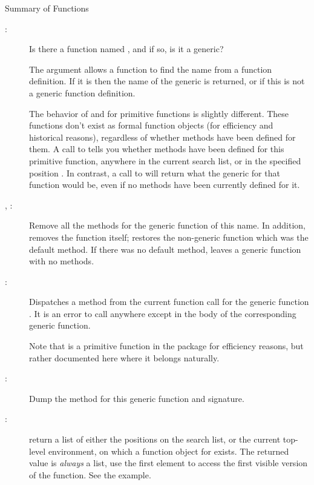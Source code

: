 %
\begin{Section}{Summary of Functions}
\begin{description}

\item[:] 
Is there a function named , and if so, is it a generic?

The  argument allows a function to find the name
from a function definition.  If it is  then the name of
the generic is returned, or  if this is not a generic
function definition.

The behavior of  and  for
primitive functions is slightly different.  These functions don't
exist as formal function objects (for efficiency and historical
reasons), regardless of whether methods have been defined for
them.  A call to  tells you whether methods have
been defined for this primitive function, anywhere in the current
search list, or in the specified position .  In
contrast, a call to  will return what the
generic for that function would be, even if no methods have been
currently defined for it.


\item[, :] 
Remove all the methods for the generic function of this
name.  In addition,  removes the function
itself;  restores the non-generic function
which was the default method.   If there was no default method,
 leaves a generic function with no methods.

\item[:] 
Dispatches a method from the current function call for the generic
function .  It is an error to call
 anywhere except in the body of the
corresponding generic function.

Note that  is a primitive function in
the  package
for efficiency 
reasons, but rather documented here where it belongs naturally.

\item[:] 
Dump the method for this generic function and signature.

\item[:] 
return a list of either the positions on the search list, or the
current top-level environment, on which a function object
for  exists.  The returned value is \emph{always} a
list, use the first element to access the first visible version
of the function.  See the example.


\end{description}
\end{Section}
